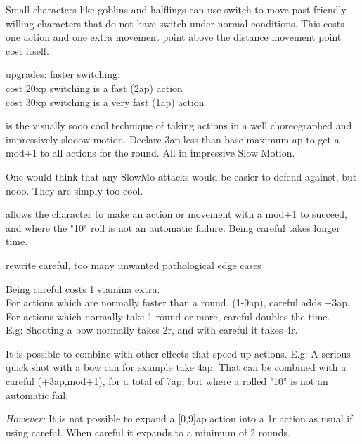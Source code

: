 Small characters like goblins and halflings can use switch to move past friendly willing characters that do not have switch under normal conditions. This costs one action and one extra movement point above the distance movement point cost itself.


upgrades: faster switching: \\
cost 20xp switching is a fast (2ap) action \\
cost 30xp switching is a very fast (1ap) action


 is the visually sooo cool technique of taking actions in a well choreographed and impressively slooow motion. Declare 3ap less than base maximum ap to get a mod+1 to all actions for the round. All in impressive Slow Motion.

One would think that any SlowMo attacks would be easier to defend against, but nooo. They are simply too cool.


 allows the character to make an action or movement with a mod+1 to succeed, and where the "10" roll is not an automatic failure. Being careful takes longer time.

\todo rewrite careful, too many unwanted pathological edge cases

Being careful costs 1 stamina extra. \\
For actions which are normally faster than a round, (1-9ap), careful adds +3ap.\\
For actions which normally take 1 round or more, careful doubles the time.\\
E.g: Shooting a bow normally takes 2r, and with careful it takes 4r.

It is possible to combine with other effects that speed up actions. E.g: A serious quick shot with a bow can for example take 4ap. That can be combined with a careful (+3ap,mod+1), for a total of 7ap, but where a rolled "10" is not an automatic fail.

\emph{However:} It is not possible to expand a [0,9]ap action into a 1r action as usual if using careful. When careful it expands to a minimum of 2 rounds.


